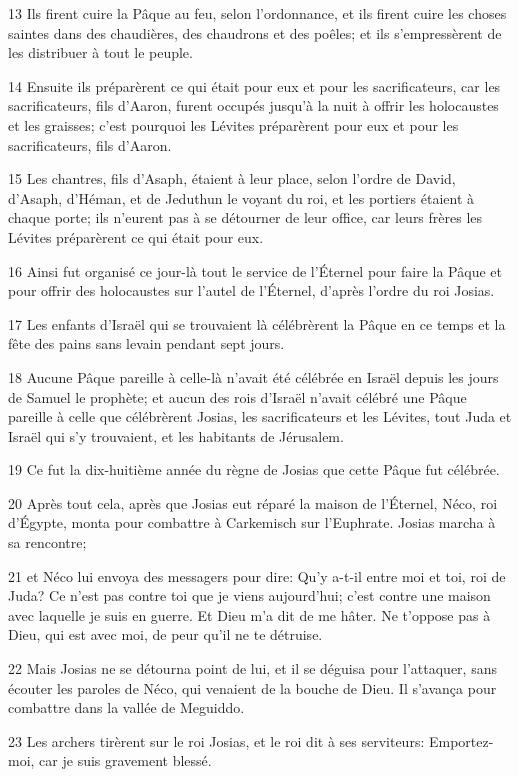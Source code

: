 \par 13 Ils firent cuire la Pâque au feu, selon l'ordonnance, et ils firent cuire les choses saintes dans des chaudières, des chaudrons et des poêles; et ils s'empressèrent de les distribuer à tout le peuple.
\par 14 Ensuite ils préparèrent ce qui était pour eux et pour les sacrificateurs, car les sacrificateurs, fils d'Aaron, furent occupés jusqu'à la nuit à offrir les holocaustes et les graisses; c'est pourquoi les Lévites préparèrent pour eux et pour les sacrificateurs, fils d'Aaron.
\par 15 Les chantres, fils d'Asaph, étaient à leur place, selon l'ordre de David, d'Asaph, d'Héman, et de Jeduthun le voyant du roi, et les portiers étaient à chaque porte; ils n'eurent pas à se détourner de leur office, car leurs frères les Lévites préparèrent ce qui était pour eux.
\par 16 Ainsi fut organisé ce jour-là tout le service de l'Éternel pour faire la Pâque et pour offrir des holocaustes sur l'autel de l'Éternel, d'après l'ordre du roi Josias.
\par 17 Les enfants d'Israël qui se trouvaient là célébrèrent la Pâque en ce temps et la fête des pains sans levain pendant sept jours.
\par 18 Aucune Pâque pareille à celle-là n'avait été célébrée en Israël depuis les jours de Samuel le prophète; et aucun des rois d'Israël n'avait célébré une Pâque pareille à celle que célébrèrent Josias, les sacrificateurs et les Lévites, tout Juda et Israël qui s'y trouvaient, et les habitants de Jérusalem.
\par 19 Ce fut la dix-huitième année du règne de Josias que cette Pâque fut célébrée.
\par 20 Après tout cela, après que Josias eut réparé la maison de l'Éternel, Néco, roi d'Égypte, monta pour combattre à Carkemisch sur l'Euphrate. Josias marcha à sa rencontre;
\par 21 et Néco lui envoya des messagers pour dire: Qu'y a-t-il entre moi et toi, roi de Juda? Ce n'est pas contre toi que je viens aujourd'hui; c'est contre une maison avec laquelle je suis en guerre. Et Dieu m'a dit de me hâter. Ne t'oppose pas à Dieu, qui est avec moi, de peur qu'il ne te détruise.
\par 22 Mais Josias ne se détourna point de lui, et il se déguisa pour l'attaquer, sans écouter les paroles de Néco, qui venaient de la bouche de Dieu. Il s'avança pour combattre dans la vallée de Meguiddo.
\par 23 Les archers tirèrent sur le roi Josias, et le roi dit à ses serviteurs: Emportez-moi, car je suis gravement blessé.
